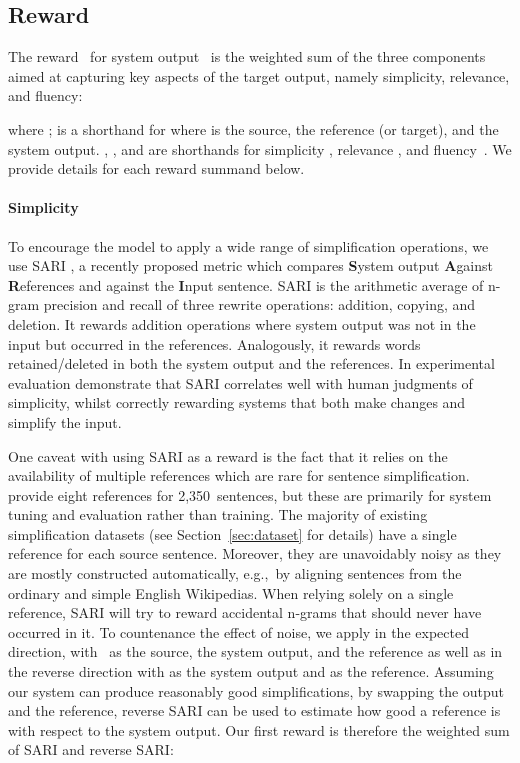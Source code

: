 \documentclass[11pt,letterpaper]{article}
\begin{document}
\subsection{Reward}
\label{sec:reward}

The reward~ for system output~ is the weighted sum of
the three components aimed at capturing key aspects of the target
output, namely simplicity, relevance, and fluency:

where ;  is a
shorthand for  where  is the source,  the
reference (or target), and  the system output. , ,
and  are shorthands for simplicity ,
relevance , and fluency~. We provide
details for each reward summand below.

\paragraph{Simplicity} To encourage the model to apply a wide range of
simplification operations, we use SARI \cite{Xu_TACL16}, a recently
proposed metric which compares \textbf{S}ystem output \textbf{A}gainst
\textbf{R}eferences and against the \textbf{I}nput sentence. SARI is
the arithmetic average of n-gram precision and recall of three rewrite
operations: addition, copying, and deletion. It rewards addition
operations where system output was not in the input but occurred in
the references. Analogously, it rewards words retained/deleted in both
the system output and the references. In experimental evaluation
 demonstrate that SARI correlates well with human
judgments of simplicity, whilst correctly rewarding systems that both
make changes and simplify the input.

One caveat with using SARI as a reward is the fact that it relies on
the availability of multiple references which are rare for sentence
simplification.  provide eight references for
2,350~sentences, but these are primarily for system tuning and
evaluation rather than training.  The majority of existing
simplification datasets (see Section~\ref{sec:dataset} for details)
have a single reference for each source sentence. Moreover, they are
unavoidably noisy as they are mostly constructed automatically,
e.g.,~by aligning sentences from the ordinary and simple English
Wikipedias. When relying solely on a single reference, SARI will try
to reward accidental n-grams that should never have occurred in it. To
countenance the effect of noise, we apply
 in the expected direction, with~ as
the source,  the system output, and  the reference as well
as in the reverse direction with  as the system output and
 as the reference.  Assuming our system can produce
reasonably good simplifications, by swapping the output and the
reference, reverse SARI can be used to estimate how good a reference
is with respect to the system output.  Our first reward is therefore
the weighted sum of SARI and reverse SARI:
\end{document}
